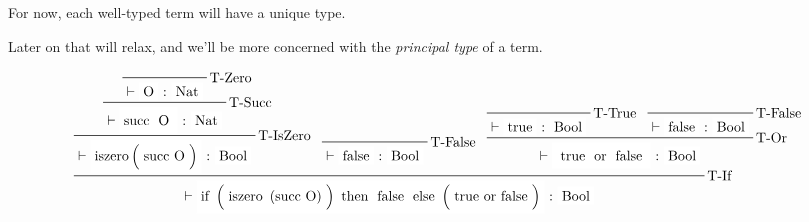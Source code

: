 \begin{frame}[c]
  For now, each well-typed term will have a unique type.
\end{frame}

\begin{frame}[c]
  Later on that will relax, and we'll be more concerned with the {\it principal
    type} of a term.
\end{frame}

\begin{frame}[c,shrink=20]

\begin{overprint}

\[\prftree[r]{T-If}
  {\prftree[r]{T-IsZero}
    {\prftree[r]{T-Succ}
      {\prftree[r]{T-Zero}
        {}
        {\vdash \highlight[white]{\text{O}} ~{:}~ \highlight[white]{\text{Nat}}}
      }
      {\vdash \highlight[white]{\text{succ}~\highlight[white]{\text{O}}} ~{:}~ \highlight[white]{\text{Nat}}}
    }
    {\vdash \highlight[white]{\text{iszero} \left( \highlight[white]{\text{succ} ~ \text{O}} \right)} ~{:}~ \highlight[white]{\text{Bool}}}
  }
  {\prftree[r]{T-False}
    {}
    {\vdash \highlight[white]{\text{false}} ~{:}~ \highlight[white]{\text{Bool}}}
  }
  {\prftree[r]{T-Or}
    {\prftree[r]{T-True}
      {}
      {\vdash \highlight[white]{\text{true}} ~{:}~ \highlight[white]{\text{Bool}}}
    }
    {\prftree[r]{T-False}
      {}
      {\vdash \highlight[white]{\text{false}} ~{:}~ \highlight[white]{\text{Bool}}}
    }
    {\vdash \highlight[white]{\highlight[white]{\text{true}}~\text{or}~\highlight[white]{\text{false}}} ~{:}~ \highlight[white]{\text{Bool}}}
  }
  {\vdash \highlight[white]{
    \text{if}~
    \left(\highlight[white]{\text{iszero}~\left(\text{succ}~\text{O}\right)}\right)~
    \text{then}~
    \highlight[white]{\text{false}}~
    \text{else}~
    \left(\highlight[white]{\text{true}~\text{or}~\text{false}}\right)} ~
    {:}~
    \highlight[white]{\text{Bool}}}\]


\end{overprint}
\end{frame}

